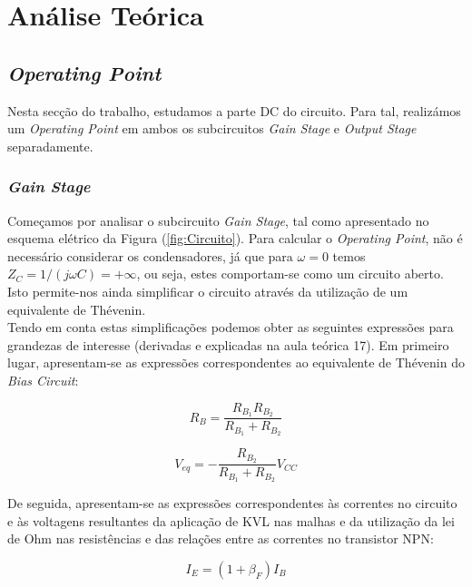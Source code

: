 \section{Análise Teórica}
\label{sec:analysis}

\subsection{\emph{Operating Point}}

Nesta secção do trabalho, estudamos a parte DC do circuito. Para tal, realizámos um \emph{Operating Point} em
ambos os subcircuitos \emph{Gain Stage} e \emph{Output Stage} separadamente.

\subsubsection{\emph{Gain Stage}}

Começamos por analisar o subcircuito \emph{Gain Stage}, tal como apresentado no esquema elétrico da Figura
(\ref{fig:Circuito}). Para calcular o \emph{Operating Point}, não é necessário considerar os condensadores, já que para
$\omega = 0$ temos $Z_C = 1/(j \omega C) = +\infty$, ou seja, estes comportam-se como um circuito aberto.
\\
Isto permite-nos ainda simplificar o circuito através da utilização de um equivalente de Thévenin.
\\
Tendo em conta estas simplificações podemos obter as seguintes expressões para grandezas de interesse (derivadas e
explicadas na aula teórica 17). Em primeiro lugar, apresentam-se as expressões correspondentes ao equivalente
de Thévenin do \emph{Bias Circuit}:

\begin{equation}
  \label{eq:RB}
  R_B = \frac{R_{B_1} R_{B_2}}{R_{B_1} + R_{B_2}}
\end{equation}

\begin{equation}
  \label{eq:Veq}
  V_{eq} = - \frac{R_{B_2}}{R_{B_1} + R_{B_2}} V_{CC}
\end{equation}

De seguida, apresentam-se as expressões correspondentes às correntes no circuito e às voltagens resultantes da
aplicação de KVL nas malhas e da utilização da lei de Ohm nas resistências e das relações entre as correntes no
transistor NPN:

\begin{equation}
  \label{eq:IE}
  I_E = (1 + \beta_F) I_B
\end{equation}

